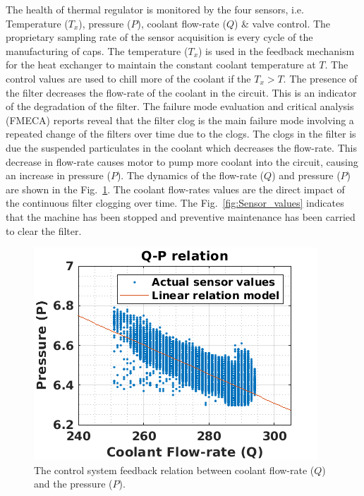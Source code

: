 \documentclass[conference]{IEEEtran}
\begin{document}
The health of thermal regulator is monitored by the four sensors, i.e. Temperature ($T_x$), pressure ($P$), coolant flow-rate ($Q$) \& valve control. The proprietary sampling rate of the sensor acquisition is every cycle of the manufacturing of caps. The temperature ($T_x$) is used in the feedback mechanism for the heat exchanger to maintain the constant coolant temperature at $T$. The control values are used to chill more of the coolant if the $T_x>T$. The presence of the filter decreases the flow-rate of the coolant in the circuit. This is an indicator of the degradation of the filter. The failure mode evaluation and critical analysis (FMECA) reports reveal that the filter clog is the main failure mode involving a repeated change of the filters over time due to the clogs. The clogs in the filter is due the suspended particulates in the coolant which decreases the flow-rate. This decrease in flow-rate causes motor to pump more coolant into the circuit, causing an increase in pressure ($P$). The dynamics of the flow-rate ($Q$) and pressure ($P$) are shown in the Fig.~\ref{fig:QP_relation}. The coolant flow-rates values are the direct impact of the continuous filter clogging over time. The Fig.~\ref{fig:Sensor_values} indicates that the machine has been stopped and preventive maintenance has been carried to clear the filter.
\begin{figure}[htbp]
\centerline{\includegraphics[width=\linewidth]{QP_relation.png}}
\caption{The control system feedback relation between coolant flow-rate ($Q$) and the pressure ($P$).}
\label{fig:QP_relation}
\end{figure}
\end{document}
